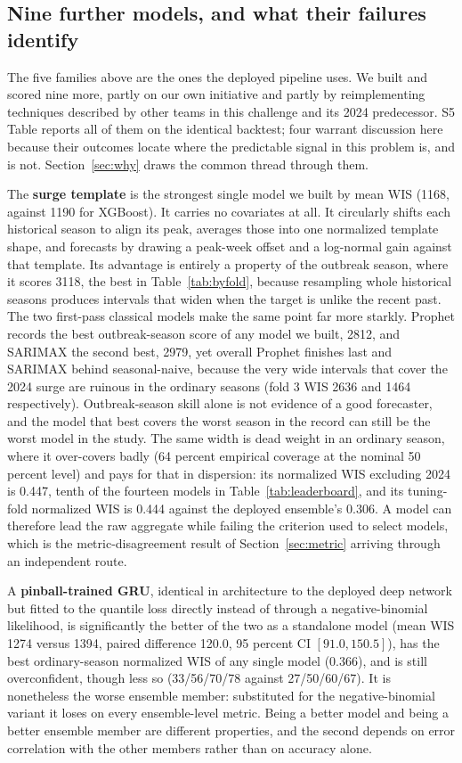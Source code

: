 \documentclass[11pt]{article}
\begin{document}
\subsection{Nine further models, and what their failures identify}\label{sec:extended}
The five families above are the ones the deployed pipeline uses. We built and scored nine more,
partly on our own initiative and partly by reimplementing techniques described by other teams in
this challenge and its 2024 predecessor. S5 Table reports all of them on the identical backtest;
four warrant discussion here because their outcomes locate where the predictable signal in this
problem is, and is not. Section~\ref{sec:why} draws the common thread through them.

The \textbf{surge template} is the strongest single model we built by mean WIS (1168, against 1190
for XGBoost). It carries no covariates at all. It circularly shifts each historical season to align
its peak, averages those into one normalized template shape, and forecasts by drawing a peak-week
offset and a log-normal gain against that template. Its advantage is entirely a property of the
outbreak season, where it scores 3118, the best in Table~\ref{tab:byfold}, because
resampling whole historical seasons produces intervals that widen when the target is unlike the
recent past. The two first-pass classical models make the same point far more starkly. Prophet
records the best outbreak-season score of any model we built, 2812, and SARIMAX the second best,
2979, yet overall Prophet finishes last and SARIMAX behind seasonal-naive, because the very wide intervals that cover the
2024 surge are ruinous in the ordinary seasons (fold 3 WIS 2636 and 1464 respectively).
Outbreak-season skill alone is not evidence of a good forecaster, and the model that best covers
the worst season in the record can still be the worst model in the study. The same width is dead weight in an ordinary season, where it over-covers badly
(64 percent empirical coverage at the nominal 50 percent level) and pays for that in dispersion:
its normalized WIS excluding 2024 is 0.447, tenth of the fourteen models in
Table~\ref{tab:leaderboard}, and its
tuning-fold normalized WIS is 0.444 against the deployed ensemble's 0.306. A model can therefore
lead the raw aggregate while failing the criterion used to select models, which is the
metric-disagreement result of Section~\ref{sec:metric} arriving through an independent route.

A \textbf{pinball-trained GRU}, identical in architecture to the deployed deep network but fitted
to the quantile loss directly instead of through a negative-binomial likelihood, is significantly
the better of the two as a standalone model (mean WIS 1274 versus 1394, paired difference 120.0,
95 percent CI $[91.0, 150.5]$), has the best ordinary-season normalized WIS of any single model
(0.366), and is still overconfident, though less so (33/56/70/78 against 27/50/60/67). It is
nonetheless the worse ensemble member: substituted for the negative-binomial variant it loses on
every ensemble-level metric. Being a better model and being a better ensemble member are different
properties, and the second depends on error correlation with the other members rather than on
accuracy alone.
\end{document}
